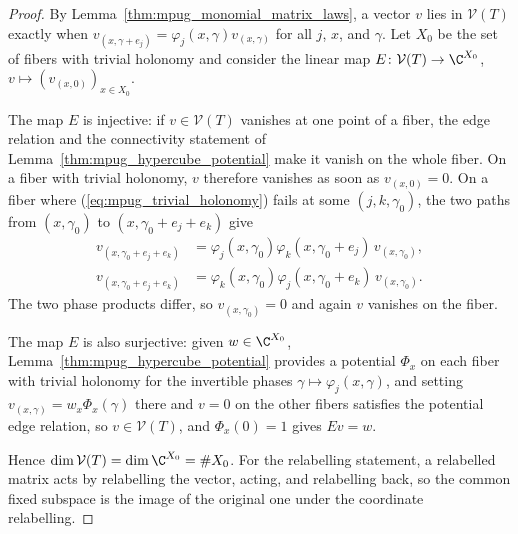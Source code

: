 \begin{proof}\leanok
    By Lemma~\ref{thm:mpug_monomial_matrix_laws}, a vector $v$ lies in
    $\mathcal V(T)$ exactly when
    $v_{(x,\gamma+e_j)}=\varphi_j(x,\gamma)v_{(x,\gamma)}$ for all $j$, $x$,
    and $\gamma$. Let $X_0$ be the set of fibers with trivial holonomy and
    consider the linear map $E\colon\mathcal V(T)\to\C^{X_0}$,
    $v\mapsto(v_{(x,0)})_{x\in X_0}$.

    The map $E$ is injective: if $v\in\mathcal V(T)$ vanishes at one point
    of a fiber, the edge relation and the connectivity statement of
    Lemma~\ref{thm:mpug_hypercube_potential} make it vanish on the whole
    fiber. On a fiber with trivial holonomy, $v$ therefore vanishes as soon
    as $v_{(x,0)}=0$. On a fiber where (\ref{eq:mpug_trivial_holonomy})
    fails at some $(j,k,\gamma_0)$, the two paths from $(x,\gamma_0)$ to
    $(x,\gamma_0+e_j+e_k)$ give
    \begin{align}
        v_{(x,\gamma_0+e_j+e_k)} & =\varphi_j(x,\gamma_0)\varphi_k(x,\gamma_0+e_j)\,v_{(x,\gamma_0)}, \\
        v_{(x,\gamma_0+e_j+e_k)} & =\varphi_k(x,\gamma_0)\varphi_j(x,\gamma_0+e_k)\,v_{(x,\gamma_0)}.
    \end{align}
    The two phase products differ, so $v_{(x,\gamma_0)}=0$ and again $v$
    vanishes on the fiber.

    The map $E$ is also surjective: given $w\in\C^{X_0}$,
    Lemma~\ref{thm:mpug_hypercube_potential} provides a potential $\Phi_x$
    on each fiber with trivial holonomy for the invertible phases
    $\gamma\mapsto\varphi_j(x,\gamma)$, and setting
    $v_{(x,\gamma)}=w_x\Phi_x(\gamma)$ there and $v=0$ on the other fibers
    satisfies the potential edge relation, so $v\in\mathcal V(T)$,
    and $\Phi_x(0)=1$ gives $Ev=w$.

    Hence $\dim\mathcal V(T)=\dim\C^{X_0}=\#X_0$. For the relabelling
    statement, a relabelled matrix acts by relabelling the vector, acting,
    and relabelling back, so the common fixed subspace is the image of the
    original one under the coordinate relabelling.
\end{proof}
